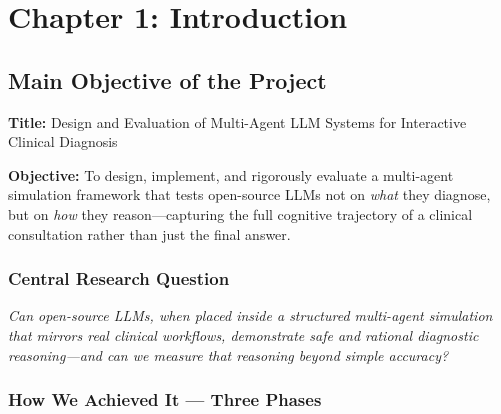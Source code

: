 \section{Chapter 1: Introduction}
\label{ch:intro}

\subsection{Main Objective of the Project}

\begin{acadbox}[\textcolor{white}{Project Objective}]
\textbf{Title:} Design and Evaluation of Multi-Agent LLM Systems for Interactive Clinical Diagnosis

\textbf{Objective:} To design, implement, and rigorously evaluate a multi-agent simulation framework that tests open-source LLMs not on \textit{what} they diagnose, but on \textit{how} they reason---capturing the full cognitive trajectory of a clinical consultation rather than just the final answer.
\end{acadbox}

\subsubsection{Central Research Question}

\begin{mattersbox}[\textcolor{white}{The Core Question}]
\textit{Can open-source LLMs, when placed inside a structured multi-agent simulation that mirrors real clinical workflows, demonstrate safe and rational diagnostic reasoning---and can we measure that reasoning beyond simple accuracy?}
\end{mattersbox}

\subsubsection{How We Achieved It --- Three Phases}

